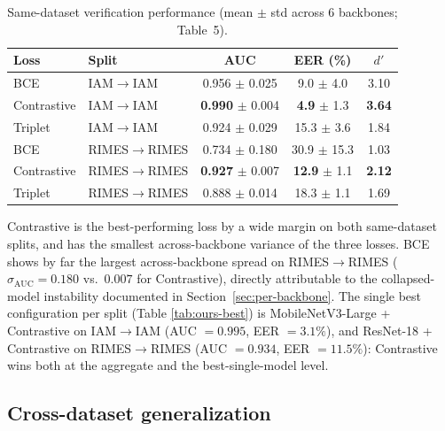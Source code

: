 \begin{table}[htbp]
  \centering
  \caption{Same-dataset verification performance (mean $\pm$ std across
  6 backbones; Table~5).}
  \label{tab:same-dataset}
  \small
  \begin{tabular}{llccc}
    \toprule
    Loss & Split & AUC & EER (\%) & $d'$ \\
    \midrule
    BCE         & IAM$\to$IAM     & 0.956 $\pm$ 0.025 & 9.0 $\pm$ 4.0  & 3.10 \\
    Contrastive & IAM$\to$IAM     & \textbf{0.990} $\pm$ 0.004 & \textbf{4.9} $\pm$ 1.3 & \textbf{3.64} \\
    Triplet     & IAM$\to$IAM     & 0.924 $\pm$ 0.029 & 15.3 $\pm$ 3.6 & 1.84 \\
    \midrule
    BCE         & RIMES$\to$RIMES & 0.734 $\pm$ 0.180 & 30.9 $\pm$ 15.3 & 1.03 \\
    Contrastive & RIMES$\to$RIMES & \textbf{0.927} $\pm$ 0.007 & \textbf{12.9} $\pm$ 1.1 & \textbf{2.12} \\
    Triplet     & RIMES$\to$RIMES & 0.888 $\pm$ 0.014 & 18.3 $\pm$ 1.1 & 1.69 \\
    \bottomrule
  \end{tabular}
\end{table}

Contrastive is the best-performing loss by a wide margin on both
same-dataset splits, and has the smallest across-backbone variance of
the three losses. BCE shows by far the largest across-backbone spread
on RIMES$\to$RIMES ($\sigma_{\text{AUC}}=0.180$ vs.\ $0.007$ for
Contrastive), directly attributable to the collapsed-model instability
documented in Section~\ref{sec:per-backbone}. The single best
configuration per split (Table \ref{tab:ours-best}) is MobileNetV3-Large + Contrastive
on IAM$\to$IAM (AUC $=0.995$, EER $=3.1\%$), and ResNet-18 +
Contrastive on RIMES$\to$RIMES (AUC $=0.934$, EER $=11.5\%$):
Contrastive wins both at the aggregate and the best-single-model
level.

\subsection{Cross-dataset generalization}
\label{sec:cross-dataset}

